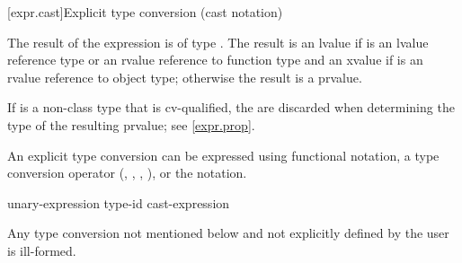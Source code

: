 [expr.cast]{Explicit type conversion (cast notation)}%

\pnum
The result of the expression   is
of type . The result is an lvalue if  is an lvalue
reference type or an rvalue reference to function type and an xvalue if 
is an rvalue reference to object type; otherwise the result is a prvalue.
\begin{note}
If  is a non-class type that is cv-qualified, the
 are discarded when determining the type of the
resulting prvalue; see \ref{expr.prop}.
\end{note}

\pnum
An explicit type conversion can be expressed using functional
notation, a type conversion operator
(, , ,
), or the  notation.

\begin{bnf}
\br
    unary-expression\br
    \terminal{(} type-id \terminal{)} cast-expression
\end{bnf}

\pnum
Any type conversion not mentioned below and not explicitly defined by
the user is ill-formed.

